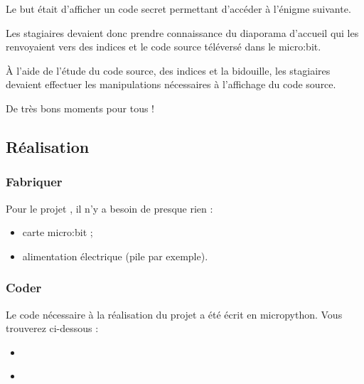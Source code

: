 \documentclass[letterpaper,10pt,french]{sphinxmanual}
\begin{document}
Le but était d’afficher un code secret permettant d’accéder
à l’énigme suivante.

\noindent{}

Les stagiaires devaient donc prendre connaissance du diaporama
d’accueil qui les renvoyaient vers des indices et le code source
téléversé dans le micro:bit.

À l’aide de l’étude du code source, des indices et la bidouille,
les stagiaires devaient effectuer les manipulations nécessaires à
l’affichage du code source.

De très bons moments pour tous !


\subsection{Réalisation}
\label{\detokenize{projets/temperature:realisation}}

\subsubsection{Fabriquer}
\label{\detokenize{projets/temperature-fabriquer:projettempfabriquer}}\label{\detokenize{projets/temperature-fabriquer::doc}}\label{\detokenize{projets/temperature-fabriquer:fabriquer}}
Pour le projet {\hyperref[\detokenize{projets/temperature:projettemp}]{}}, il n’y a besoin de presque rien :
\begin{itemize}
\item {} 
carte micro:bit ;

\item {} 
alimentation électrique (pile par exemple).

\end{itemize}
\label{\detokenize{projets/temperature-coder:projettempcoder}}
\ignorespaces 

\subsubsection{Coder}
\label{\detokenize{projets/temperature-coder:index-0}}\label{\detokenize{projets/temperature-coder:coder}}\label{\detokenize{projets/temperature-coder::doc}}
Le code nécessaire à la réalisation du projet {\hyperref[\detokenize{projets/temperature:projettemp}]{}} a été
écrit en micropython. Vous trouverez ci-dessous :
\begin{itemize}
\item {} 
{\hyperref[\detokenize{projets/temperature-coder:le-code-etape-par-etape}]{}}

\item {} 
{\hyperref[\detokenize{projets/temperature-coder:le-code-final}]{}}

\end{itemize}
\end{document}
